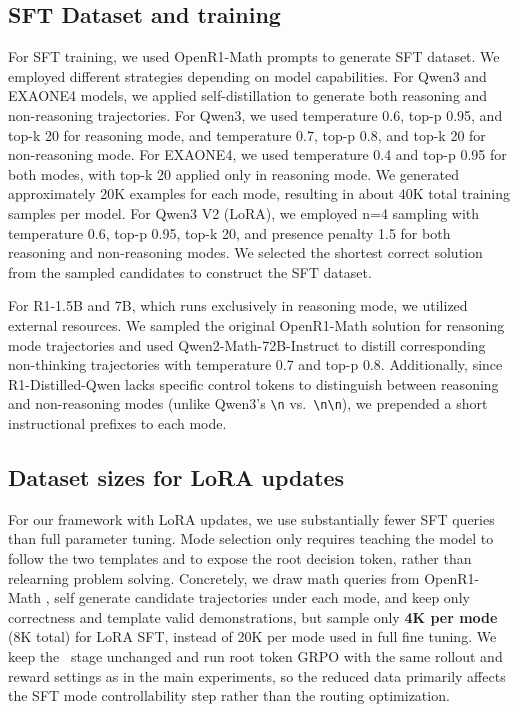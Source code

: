 \subsection{SFT Dataset and training}

For SFT training, we used OpenR1-Math prompts to generate SFT dataset. We employed different strategies depending on model capabilities. For Qwen3 and EXAONE4 models, we applied self-distillation to generate both reasoning and non-reasoning trajectories. For Qwen3, we used temperature 0.6, top-p 0.95, and top-k 20 for reasoning mode, and temperature 0.7, top-p 0.8, and top-k 20 for non-reasoning mode. For EXAONE4, we used temperature 0.4 and top-p 0.95 for both modes, with top-k 20 applied only in reasoning mode. We generated approximately 20K examples for each mode, resulting in about 40K total training samples per model.
For Qwen3 V2 (LoRA), we employed n=4 sampling with temperature 0.6, top-p 0.95, top-k 20, and presence penalty 1.5 for both reasoning and non-reasoning modes. We selected the shortest correct solution from the sampled candidates to construct the SFT dataset.

For R1-1.5B and 7B, which runs exclusively in reasoning mode, we utilized external resources. We sampled the original OpenR1-Math solution for reasoning mode trajectories and used Qwen2-Math-72B-Instruct to distill corresponding non-thinking trajectories with temperature 0.7 and top-p 0.8. Additionally, since R1-Distilled-Qwen lacks specific control tokens to distinguish between reasoning and non-reasoning modes (unlike Qwen3's \texttt{\textbackslash n} vs.\ \texttt{\textbackslash n\textbackslash n}), we prepended a short instructional prefixes to each mode.

\subsection{Dataset sizes for LoRA updates}

For our framework with LoRA updates, we use substantially fewer SFT queries than full parameter tuning. Mode selection only requires teaching the model to follow the two templates and to expose the root decision token, rather than relearning problem solving. Concretely, we draw math queries from OpenR1-Math \cite{openr1_openr1_math_220k_2025}, self generate candidate trajectories under each mode, and keep only correctness and template valid demonstrations, but sample only \textbf{4K per mode} (8K total) for LoRA SFT, instead of 20K per mode used in full fine tuning. We keep the \Ours~stage unchanged and run root token GRPO with the same rollout and reward settings as in the main experiments, so the reduced data primarily affects the SFT mode controllability step rather than the routing optimization.

